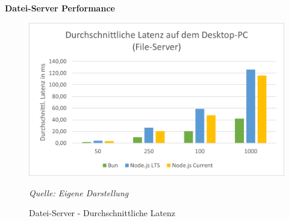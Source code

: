 \noindent
\textbf{Datei-Server Performance}
\begin{figure}[h!]
	\centering
	\includegraphics[width=\linewidth]{./images/fileServerAverageLatencyDesktop.png}
	\caption{Datei-Server - Durchschnittliche Latenz}
	\label{fig:fileServerAverageLatency}
	\textit{Quelle: Eigene Darstellung}
\end{figure}

